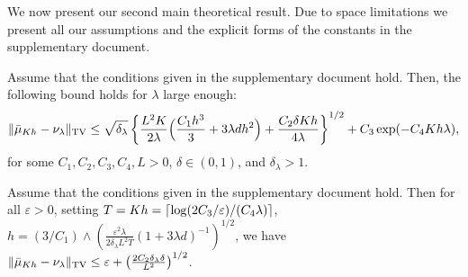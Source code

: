 We now present our second main theoretical result. Due to space limitations we present all our assumptions and the explicit forms of the constants in the supplementary document. 
\begin{thm}
\label{thm:euler}
Assume that the conditions given in the supplementary document hold. Then, the following bound holds for $\lambda$ large enough:
\begin{align}
\| \bar{\mu}_{Kh} - \nu_\lambda \|_{\textnormal{TV}} \leq \sqrt{\delta_\lambda} \left \lbrace  \frac{L^2 K}{2\lambda} \Bigl( \frac{C_1 h^3}{3} + 3 \lambda d h^2 \Bigr) + \frac{C_2  \delta K h}{4\lambda} \right \rbrace^{1/2} +  C_3 \exp(-C_4 Kh \lambda),
\end{align} 
for some $C_1,C_2,C_3,C_4,L >0$, $\delta \in (0,1)$, and $\delta_\lambda >1$. %
\end{thm}




\begin{cor}
  \label{coro:precision}
  Assume that the conditions given in the supplementary document hold. Then for all $\varepsilon >0$, setting
$T = Kh  = \left\lceil \log(2C_3/\varepsilon)/(C_4\lambda) \right\rceil$, %
$h = (3/C_1)\wedge\left(\frac{\varepsilon^2 \lambda}{2\delta_\lambda L^2 T}(1+3\lambda d)^{-1}\right)^{1/2}$, %
  we have
    $\| \bar{\mu}_{Kh} - \nu_\lambda \|_{\textnormal{TV}} \leq \varepsilon + \left(\frac{2 C_2 \delta_\lambda \delta}{L^2}\right)^{1/2} $. 
\end{cor}

